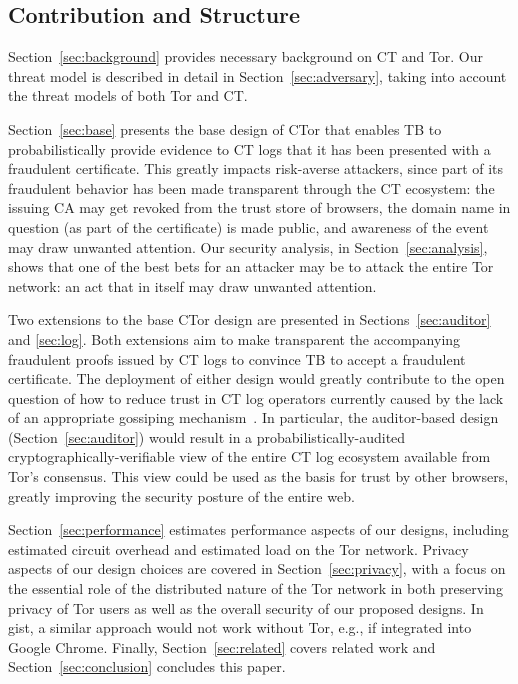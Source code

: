 \subsection{Contribution and Structure}
Section~\ref{sec:background} provides necessary background on CT and Tor. Our
threat model is described in detail in Section~\ref{sec:adversary}, taking into
account the threat models of both Tor and CT\@.

Section~\ref{sec:base} presents the base design of CTor that enables TB to
probabilistically provide evidence to CT logs that it has been presented with a
fraudulent certificate. This greatly impacts risk-averse attackers, since part
of its fraudulent behavior has been made transparent through the CT ecosystem:
the issuing CA may get revoked from the trust store of browsers, the domain name
in question (as part of the certificate) is made public, and awareness of the
event may draw unwanted attention. Our security analysis, in
Section~\ref{sec:analysis}, shows that one of the best bets for an attacker may
be to attack the entire Tor network: an act that in itself may draw unwanted
attention.

Two extensions to the base CTor design are presented in
Sections~\ref{sec:auditor} and \ref{sec:log}. Both extensions aim to make
transparent the accompanying fraudulent proofs issued by CT logs to convince TB
to accept a fraudulent certificate. The deployment of either design would
greatly contribute to the open question of how to reduce trust in CT log operators
currently caused by the lack of an appropriate gossiping mechanism~\cite{FIXME}.
In particular, the auditor-based design (Section~\ref{sec:auditor}) would result
in a probabilistically-audited cryptographically-verifiable view of the entire
CT log ecosystem available from Tor's consensus. This view could be used as the
basis for trust by other browsers, greatly improving the security posture of the
entire web.

Section~\ref{sec:performance} estimates performance aspects of our designs,
including estimated circuit overhead and estimated load on the Tor network.
Privacy aspects of our design choices are covered in Section~\ref{sec:privacy},
with a focus on the essential role of the distributed nature of the Tor network
in both preserving privacy of Tor users as well as the overall security of our
proposed designs. In gist, a similar approach would not work without Tor, e.g.,
if integrated into Google Chrome. Finally, Section~\ref{sec:related} covers
related work and Section~\ref{sec:conclusion} concludes this paper.

